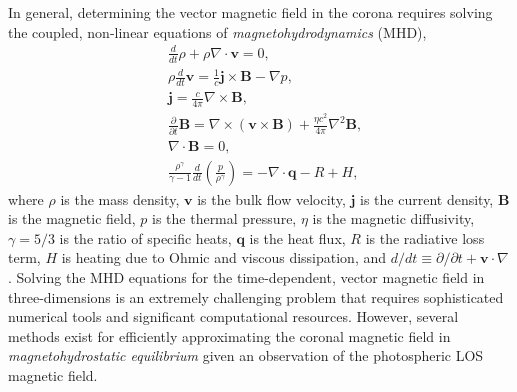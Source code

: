 In general, determining the vector magnetic field in the corona requires solving the coupled, non-linear equations of \textit{magnetohydrodynamics} (MHD),
\begin{align}
    &\frac{d}{dt}\rho + \rho\nabla\cdot\mathbf{v} = 0, \label{eq:mhd_continuity} \\
    &\rho\frac{d}{dt}\mathbf{v} = \frac{1}{c}\mathbf{j}\times\mathbf{B} - \nabla p, \label{eq:mhd_momentum} \\
    &\mathbf{j} = \frac{c}{4\pi}\nabla\times\mathbf{B}, \label{eq:mhd_ampere} \\
    &\frac{\partial}{\partial t}\mathbf{B} = \nabla\times(\mathbf{v}\times\mathbf{B}) + \frac{\eta c^2}{4\pi}\nabla^2\mathbf{B}, \label{eq:mhd_faraday} \\
    &\nabla\cdot\mathbf{B} = 0, \label{eq:mhd_divb} \\
    &\frac{\rho^\gamma}{\gamma - 1}\frac{d}{dt}\left(\frac{p}{\rho^{\gamma}}\right) = -\nabla\cdot\mathbf{q} - R + H, \label{eq:mhd_energy}
\end{align}
where $\rho$ is the mass density, $\mathbf{v}$ is the bulk flow velocity, $\mathbf{j}$ is the current density, $\mathbf{B}$ is the magnetic field, $p$ is the thermal pressure, $\eta$ is the magnetic diffusivity, $\gamma=5/3$ is the ratio of specific heats, $\mathbf{q}$ is the heat flux, $R$ is the radiative loss term, $H$ is heating due to Ohmic and viscous dissipation, and $d/dt\equiv\partial/\partial t + \mathbf{v}\cdot\nabla$ \citep{priest_magnetohydrodynamics_2014}. Solving the MHD equations for the time-dependent, vector magnetic field in three-dimensions is an extremely challenging problem that requires sophisticated numerical tools and significant computational resources. However, several methods exist for efficiently approximating the coronal magnetic field in \textit{magnetohydrostatic equilibrium} given an observation of the photospheric LOS magnetic field.


